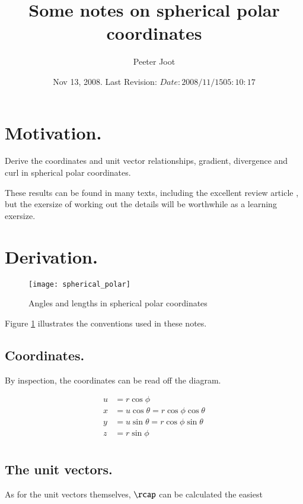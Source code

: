 \documentclass{article}
\title{Some notes on spherical polar coordinates}
\author{Peeter Joot}
\date{ Nov 13, 2008.  Last Revision: $Date: 2008/11/15 05:10:17 $ }
\begin{document}
\maketitle{}

\section{ Motivation. }

Derive the coordinates and unit vector relationships, gradient, divergence and curl in spherical polar coordinates.

These results can be found in many texts, including the excellent review article \cite{fleischCoords}, but 
the exersize of working out the details will be worthwhile as a learning exersize.

\section{ Derivation. }

\begin{figure}[htp]
\centering
\texttt{[image: spherical\_polar]}
\caption{Angles and lengths in spherical polar coordinates}\label{fig:spherical_polar}
\end{figure}

Figure \ref{fig:spherical_polar} illustrates the conventions used in 
these notes.

\subsection{ Coordinates. }

By inspection, the coordinates can be read off the diagram.

\begin{align*}
u &= r \cos\phi \\
x &= u \cos\theta = r \cos\phi \cos\theta \\
y &= u \sin\theta = r \cos\phi \sin\theta \\
z &= r \sin\phi \\
\end{align*}

\subsection{ The unit vectors. }

As for the unit vectors themselves, $\rcap$ can be calculated the easiest
\end{document}
